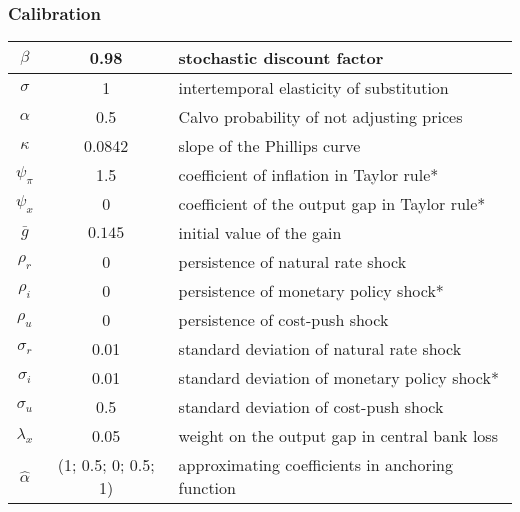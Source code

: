 \documentclass[10pt]{beamer}
\begin{document}
\begin{frame}
	\frametitle{Calibration}

\begin{center}
\begin{table}
\begin{tabular}{ c | c  | l }
 $\beta$ & 0.98 & stochastic discount factor \\  \hline
 $\sigma$ & 1  & intertemporal elasticity of substitution \\  \hline
 $\alpha$ & 0.5 &  Calvo probability of not adjusting prices \\\hline
 $\kappa$ & 0.0842 &  slope of the Phillips curve \\\hline
 $\psi_{\pi} $& 1.5  & coefficient of inflation in Taylor rule*\\\hline
 $\psi_x$ & 0   & coefficient of the output gap in Taylor rule*  \\\hline %
 $\bar{g}$ & $0.145$  & initial value of the gain \\\hline %
    $\rho_r$ & 0 &   persistence of natural rate shock \\ \hline %
    $\rho_i$ & 0 &  persistence of monetary policy shock*  \\ \hline
    $\rho_u$ & 0  &  persistence of cost-push shock  \\ \hline
    $\sigma_r$ & 0.01 & standard deviation of natural rate shock  \\ \hline
    $\sigma_i$ &  0.01  &standard deviation of monetary policy shock*  \\ \hline %
    $\sigma_u$ & 0.5 & standard deviation of cost-push shock   \\ \hline  
    $\lambda_x$ & 0.05 & weight on the output gap in central bank loss   \\ \hline  %
    $\hat{\alpha}$ & (1; 0.5; 0; 0.5; 1) & approximating coefficients in anchoring function \\ \hline   
\end{tabular}     
       \label{calibration}
 \end{table}
\end{center}
\end{frame}
\end{document}
